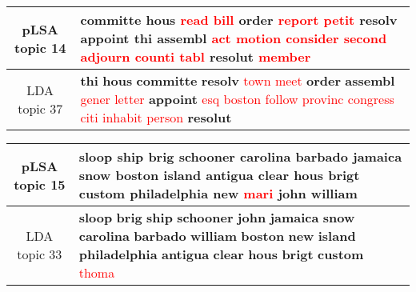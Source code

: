 \begin{center}\begin{tabularx}{\textwidth} {
  | c | >{\raggedright\arraybackslash}X | } \hline 
pLSA topic 14 & \textbf{committe} \textbf{hous} \textcolor{red}{read} \textcolor{red}{bill} \textbf{order} \textcolor{red}{report} \textcolor{red}{petit} \textbf{resolv} \textbf{appoint} \textbf{thi} \textbf{assembl} \textcolor{red}{act} \textcolor{red}{motion} \textcolor{red}{consider} \textcolor{red}{second} \textcolor{red}{adjourn} \textcolor{red}{counti} \textcolor{red}{tabl} \textbf{resolut} \textcolor{red}{member} \\ \hline 
LDA topic 37 & \textbf{thi} \textbf{hous} \textbf{committe} \textbf{resolv} \textcolor{red}{town} \textcolor{red}{meet} \textbf{order} \textbf{assembl} \textcolor{red}{gener} \textcolor{red}{letter} \textbf{appoint} \textcolor{red}{esq} \textcolor{red}{boston} \textcolor{red}{follow} \textcolor{red}{provinc} \textcolor{red}{congress} \textcolor{red}{citi} \textcolor{red}{inhabit} \textcolor{red}{person} \textbf{resolut} \\ \hline 
\end{tabularx}

\end{center}

\begin{center}\begin{tabularx}{\textwidth} {
  | c | >{\raggedright\arraybackslash}X | } \hline 
pLSA topic 15 & \textbf{sloop} \textbf{ship} \textbf{brig} \textbf{schooner} \textbf{carolina} \textbf{barbado} \textbf{jamaica} \textbf{snow} \textbf{boston} \textbf{island} \textbf{antigua} \textbf{clear} \textbf{hous} \textbf{brigt} \textbf{custom} \textbf{philadelphia} \textbf{new} \textcolor{red}{mari} \textbf{john} \textbf{william} \\ \hline 
LDA topic 33 & \textbf{sloop} \textbf{brig} \textbf{ship} \textbf{schooner} \textbf{john} \textbf{jamaica} \textbf{snow} \textbf{carolina} \textbf{barbado} \textbf{william} \textbf{boston} \textbf{new} \textbf{island} \textbf{philadelphia} \textbf{antigua} \textbf{clear} \textbf{hous} \textbf{brigt} \textbf{custom} \textcolor{red}{thoma} \\ \hline 
\end{tabularx}

\end{center}

